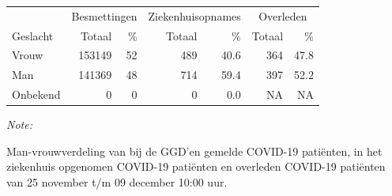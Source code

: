 \documentclass[
  english,
  man,floatsintext]{apa6}
\begin{document}
\newpage

\begin{table}
\centering\begingroup\fontsize{11}{13}\selectfont

\begin{threeparttable}
\begin{tabular}{lrrrrrr}
\toprule
\multicolumn{1}{c}{ } & \multicolumn{2}{c}{Besmettingen} & \multicolumn{2}{c}{Ziekenhuisopnames} & \multicolumn{2}{c}{Overleden} \\
\cmidrule(l{3pt}r{3pt}){2-3} \cmidrule(l{3pt}r{3pt}){4-5} \cmidrule(l{3pt}r{3pt}){6-7}
Geslacht & Totaal & \% & Totaal & \% & Totaal & \%\\
\midrule
Vrouw & 153149 & 52 & 489 & 40.6 & 364 & 47.8\\
Man & 141369 & 48 & 714 & 59.4 & 397 & 52.2\\
Onbekend & 0 & 0 & 0 & 0.0 & NA & NA\\
\bottomrule
\end{tabular}
\begin{tablenotes}
\item \textit{Note: } 
\item Man-vrouwverdeling van bij de GGD’en gemelde COVID-19 patiënten, in het ziekenhuis opgenomen COVID-19 patiënten en overleden COVID-19 patiënten van 25 november t/m 09 december 10:00 uur.
\end{tablenotes}
\end{threeparttable}
\endgroup{}
\end{table}
\newpage
\end{document}
